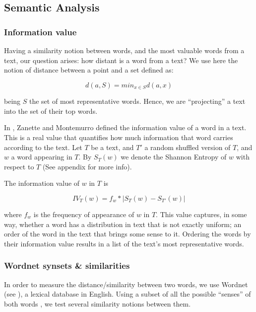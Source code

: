 \documentclass{pnastwo}
\begin{document}
\begin{article}
\subsection{Semantic Analysis}
\medskip
\subsubsection{Information value}

Having a similarity notion between words, and the most valuable words from a text, our question arises: how distant is a word from a text? We use here the notion of distance between a point and a set defined as:

\begin{equation}
  d(a, S) = min_{x \in S} d(a, x) 
\end{equation}

being $S$ the set of most representative words. Hence, we are ``projecting'' a text into the set of their top words. 


In \cite{DARWIN}, Zanette and Montemurro defined the information value of a word in a text. This is
a real value that quantifies how much information that word carries according to the text. Let $T$ be a 
text, and $T'$ a random shuffled version of $T$, and $w$ a word appearing in $T$. 
By $S_T(w)$ we denote the Shannon Entropy of $w$ with respect to $T$ (See appendix for more info). 

The information value of $w$ in $T$ is 

\begin{equation}
  IV_T(w) = f_w* | S_T(w) - S_{T'}(w) | 
\end{equation}

where $f_w$ is the frequency of appearance of $w$ in $T$. This value captures, in some way, whether a word
has a distribution in text that is not exactly uniform; an order of the word in the text that brings some sense to it. Ordering the words by their information value results in a list of the text's most representative words.



\subsubsection{Wordnet synsets \& similarities}

In order to measure the distance/similarity between two words, we use Wordnet (see \cite{WORDNET}), a lexical database in English. Using a subset of all the possible ``senses'' of both words , we test several similarity notions between them.



\end{article}
\end{document}

